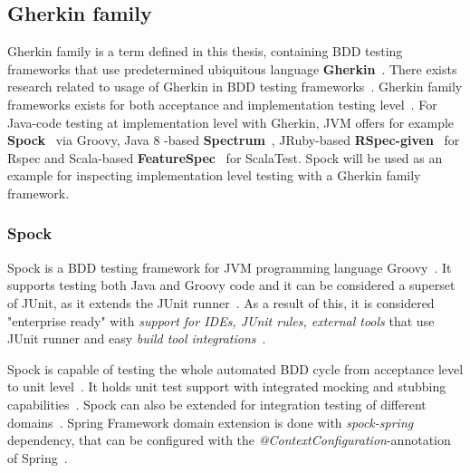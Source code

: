     \subsection{Gherkin family}
    Gherkin family is a term defined in this thesis, containing BDD testing frameworks that use predetermined ubiquitous
    language \textbf{Gherkin}~\cite{gherkin}. There exists research related to usage of Gherkin in BDD testing frameworks~\cite{okolnychyi2016study}.
    Gherkin family frameworks exists for both acceptance and implementation testing level~\cite{okolnychyi2016study}. For Java-code testing at
    implementation level with Gherkin, JVM offers for example \textbf{Spock}~\cite{spock} via Groovy, Java 8 -based \textbf{Spectrum}~\cite{spectrum},
    JRuby-based \textbf{RSpec-given}~\cite{rspec-given} for Rspec and Scala-based \textbf{FeatureSpec}~\cite{featurespec} for ScalaTest.
    Spock will be used as an example for inspecting implementation level testing with a Gherkin family framework.

    \subsubsection{Spock}
    Spock is a BDD testing framework for JVM programming language Groovy~\cite{kapelonis2016java}. It supports
    testing both Java and Groovy code and it can be considered a superset of JUnit, as it extends the JUnit runner~\cite{spock}.
    As a result of this, it is considered "enterprise ready" with \textit{support for IDEs, JUnit rules, external tools} that use
    JUnit runner and easy \textit{build tool integrations}~\cite{kapelonis2016java}.

    Spock is capable of testing the whole automated BDD cycle from acceptance level to unit level~\cite{kapelonis2016java}.
    It holds unit test support with integrated mocking and stubbing capabilities~\cite{spock}.
    Spock can also be extended for integration testing of different domains~\cite{kapelonis2016java}.
    Spring Framework domain extension is done with \textit{spock-spring} dependency, that can be configured with
    the \textit{@ContextConfiguration}-annotation of Spring~\cite{springintegration}.

